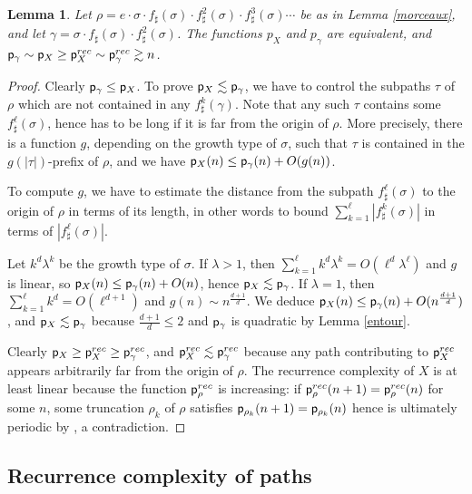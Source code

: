 \documentclass[11pt]{amsart}
\newtheorem{lem}[thm]{Lemma}
\theoremstyle{remark}
\newcommand{\pr}{\cp^{rec}}
\newcommand{\cp}{{\sf  p}}
\begin{document}
   \begin{lem} \label{compar}
   Let   
   $\rho=e\cdot\sigma \cdot f_\sharp (\sigma)\cdot f^2_\sharp(\sigma)\cdot f^3_\sharp(\sigma)\cdots $
   be as in Lemma \ref{morceaux}, and let 
    $\gamma=\sigma \cdot f_\sharp (\sigma)\cdot f^2_\sharp(\sigma)$.
   The functions $p_X$ and $p_\gamma$ are equivalent, and  
$\cp_\gamma\sim \cp_X\ge \pr_X\sim\pr_\gamma\gtrsim n$.  
\end{lem}


\begin{proof}
Clearly $\cp_\gamma\le \cp_X$.  To prove  $\cp_X\lesssim \cp_\gamma$, we have to control the subpaths $\tau$ of $\rho$ which are not contained in any $f^k_\sharp(\gamma)$. 
Note that any such $\tau$ contains some $f^\ell_\sharp(\sigma)$, hence has to be long if it is far from the origin of $\rho$.  More precisely, there is a function $g $, depending on the growth type of $\sigma$, such that   $\tau$  
is contained in the $g( | \tau | )$-prefix of $\rho$, and we have $\cp_X(n)\le \cp_\gamma(n)+O(g(n))$.

To compute $g$, we have to estimate the distance from the subpath $f^\ell_\sharp(\sigma)$ to the origin of $\rho$  in terms of its length, in other words to 
bound $\sum_{k=1}^\ell | f^ k_\sharp(\sigma) | $ in terms of $ | f^\ell_\sharp(\sigma) | $.

Let $k^d \lambda^k $ be the growth type of $\sigma$. If $\lambda>1$, then   $\sum_{k=1}^\ell k^d\lambda^k  =O(  \ell^d \lambda^\ell)$ and $g$ is linear, so $\cp_X(n)\le \cp_\gamma(n)+O(n)$, hence $\cp_X\lesssim \cp_\gamma$.  If $\lambda=1$, then   $\sum_{k=1}^\ell   k^d =O(    \ell^{d+1})$ and $g(n)\sim n^{\frac{d+1}d}$. We deduce $\cp_X(n)\le \cp_\gamma(n)+O(n^{\frac{d+1}d})$, and $\cp_X\lesssim \cp_\gamma$ because ${\frac{d+1}d}\le 2$ and $\cp_\gamma$ is quadratic by Lemma \ref{entour}.

 
Clearly $\cp_X\ge \pr_X\ge\pr_\gamma$, 
and $\pr_X\lesssim \pr_\gamma$ because 
any path contributing to $\pr_X$ appears arbitrarily far from the origin of $\rho$.  The recurrence complexity of $X$ is at least linear because the function $\pr_\rho$ is increasing:
if $\pr_\rho(n+1)=\pr_\rho(n)$ for some $n$, some truncation $ \rho _k$ of $\rho$ satisfies $\cp_{\rho _k}(n+1)=\cp_{\rho _k}(n)$ hence is 
  ultimately periodic   by \cite{morse}, a contradiction.
  \end{proof}


\subsection{Recurrence complexity of paths}
\end{document}
